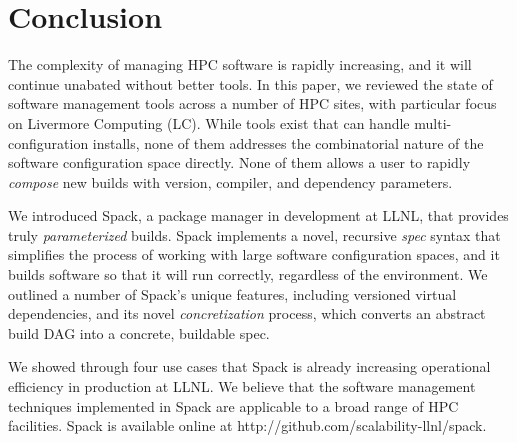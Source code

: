 
\section{Conclusion}
\label{sec:conclusion}


The complexity of managing HPC software is rapidly increasing, and it
will continue unabated without better tools.
In this paper, we reviewed the state of software management tools
across a number of HPC sites, with particular focus on Livermore
Computing (LC). While tools exist that can handle multi-configuration
installs, none of them addresses the combinatorial nature
of the software configuration space directly. None of them allows
a user to rapidly {\it compose} new builds with version, compiler,
and dependency parameters.

We introduced Spack, a package manager in development at LLNL, that
provides truly {\it parameterized} builds.  Spack implements
a novel, recursive {\it spec} syntax that simplifies the process of working
with large software configuration spaces, and it builds software
so that it will run correctly, regardless of the environment.
We outlined a number of Spack's unique features, including
versioned virtual dependencies, and its novel {\it concretization}
process, which converts an abstract build DAG into a concrete,
buildable spec.

We showed through four use cases that Spack is already increasing
operational efficiency in production at LLNL.  We believe that the
software management techniques implemented in Spack are applicable
to a broad range of HPC facilities.
Spack is available online at http://github.com/scalability-llnl/spack.
